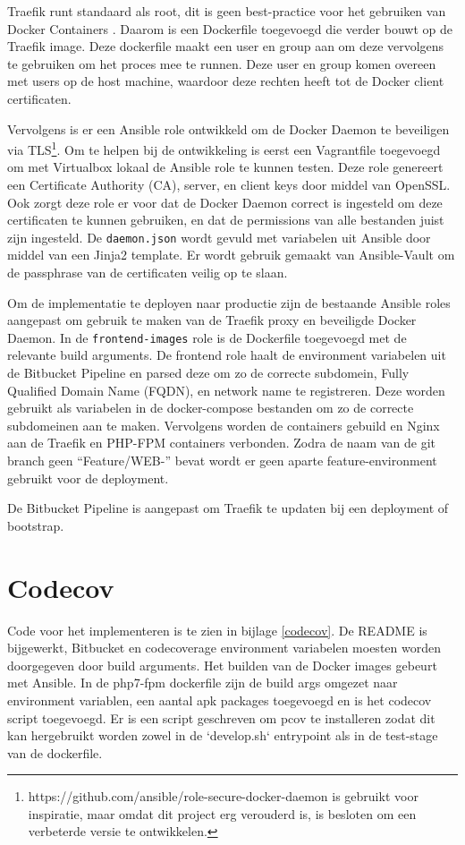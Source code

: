 Traefik runt standaard als root, dit is geen best-practice voor het gebruiken van Docker Containers \parencite{DockerBestPractices}. Daarom is een Dockerfile toegevoegd die verder bouwt op de Traefik image. Deze dockerfile maakt een user en group aan om deze vervolgens te gebruiken om het proces mee te runnen. Deze user en group komen overeen met users op de host machine, waardoor deze rechten heeft tot de Docker client certificaten.

Vervolgens is er een Ansible role ontwikkeld om de Docker Daemon te beveiligen via TLS\footnote{https://github.com/ansible/role-secure-docker-daemon is gebruikt voor inspiratie, maar omdat dit project erg verouderd is, is besloten om een verbeterde versie te ontwikkelen.}. Om te helpen bij de ontwikkeling is eerst een Vagrantfile toegevoegd om met Virtualbox lokaal de Ansible role te kunnen testen. Deze role genereert een Certificate Authority (CA), server, en client keys door middel van OpenSSL. Ook zorgt deze role er voor dat de Docker Daemon correct is ingesteld om deze certificaten te kunnen gebruiken, en dat de permissions van alle bestanden juist zijn ingesteld. De \texttt{daemon.json} wordt gevuld met variabelen uit Ansible door middel van een Jinja2 template. Er wordt gebruik gemaakt van Ansible-Vault om de passphrase van de certificaten veilig op te slaan.

Om de implementatie te deployen naar productie zijn de bestaande Ansible roles aangepast om gebruik te maken van de Traefik proxy en beveiligde Docker Daemon. In de \texttt{frontend-images} role is de Dockerfile toegevoegd met de relevante build arguments. De frontend role haalt de environment variabelen uit de Bitbucket Pipeline en parsed deze om zo de correcte subdomein, Fully Qualified Domain Name (FQDN), en network name te registreren. Deze worden gebruikt als variabelen in de docker-compose bestanden om zo de correcte subdomeinen aan te maken. Vervolgens worden de containers gebuild en Nginx aan de Traefik en PHP-FPM containers verbonden. Zodra de naam van de git branch geen \enquote{Feature/WEB-} bevat wordt er geen aparte feature-environment gebruikt voor de deployment.

De Bitbucket Pipeline is aangepast om Traefik te updaten bij een deployment of bootstrap.

\section{Codecov}
Code voor het implementeren is te zien in bijlage \ref{codecov}. De README is bijgewerkt, Bitbucket en codecoverage environment variabelen moesten worden doorgegeven door build arguments. Het builden van de Docker images gebeurt met Ansible. In de php7-fpm dockerfile zijn de build args omgezet naar environment variablen, een aantal apk packages toegevoegd en is het codecov script toegevoegd. Er is een script geschreven om pcov te installeren zodat dit kan hergebruikt worden zowel in de `develop.sh` entrypoint als in de test-stage van de dockerfile.


